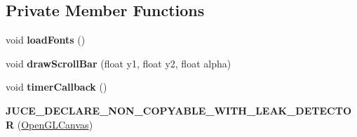 \subsection*{Private Member Functions}
\begin{DoxyCompactItemize}
\item 
\hypertarget{classOpenGLCanvas_a5bc0ce35efc400e7fdd133be03a8b54a}{void {\bfseries load\-Fonts} ()}\label{classOpenGLCanvas_a5bc0ce35efc400e7fdd133be03a8b54a}

\item 
\hypertarget{classOpenGLCanvas_a10b8b42f2bcaabf2ac7c44026bb83d9a}{void {\bfseries draw\-Scroll\-Bar} (float y1, float y2, float alpha)}\label{classOpenGLCanvas_a10b8b42f2bcaabf2ac7c44026bb83d9a}

\item 
\hypertarget{classOpenGLCanvas_ab74dc4155e9207ea7141ca10a980212f}{void {\bfseries timer\-Callback} ()}\label{classOpenGLCanvas_ab74dc4155e9207ea7141ca10a980212f}

\item 
\hypertarget{classOpenGLCanvas_a800f34228a031ebc4034ba5f1cf034bb}{{\bfseries J\-U\-C\-E\-\_\-\-D\-E\-C\-L\-A\-R\-E\-\_\-\-N\-O\-N\-\_\-\-C\-O\-P\-Y\-A\-B\-L\-E\-\_\-\-W\-I\-T\-H\-\_\-\-L\-E\-A\-K\-\_\-\-D\-E\-T\-E\-C\-T\-O\-R} (\hyperlink{classOpenGLCanvas}{Open\-G\-L\-Canvas})}\label{classOpenGLCanvas_a800f34228a031ebc4034ba5f1cf034bb}

\end{DoxyCompactItemize}
